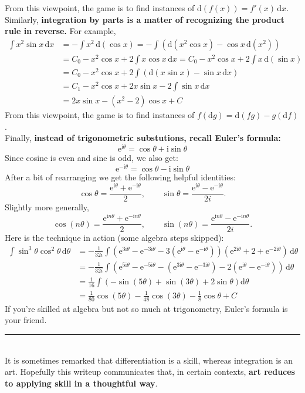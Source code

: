 \documentclass[12pt]{memoir}
\def\br{~\\[1em]}
\def\dd{\mathrm d}
\def\ee{\mathrm e}
\def\ii{\mathrm i}
\begin{document}
From this viewpoint, the game is to find instances of 
$\dd(f(x)) = f'(x)\,\dd x$.
\vfill\pagebreak
\noindent
Similarly, 
\textbf{integration by parts is a matter of recognizing the product
rule in reverse.} For example,
\begin{align*}
\int x^2\sin x\,\dd x
&= -\int x^2\,\dd(\cos x)
= -\int\left(\dd\left(x^2\cos x\right) - \cos x\,\dd(x^2)\right)\\
&= C_0 - x^2\cos x + 2\int x\cos x\,\dd x
= C_0 - x^2\cos x + 2\int x\,\dd(\sin x)\\
&= C_0 - x^2\cos x + 2\int\left(\dd(x\sin x) - \sin x\,\dd x\right)\\
&= C_1 - x^2\cos x + 2x\sin x - 2\int\sin x\,\dd x\\
&= \boxed{2x\sin x - (x^2 - 2)\cos x + C}
\end{align*}
From this viewpoint, the game is to find instances of
$f(\dd g) = \dd(fg) - g(\dd f)$.
\br
Finally,
\textbf{instead of trigonometric substutions, recall Euler's formula:}
\[\ee^{\ii\theta} = \cos\theta + \ii\sin\theta\]
Since cosine is even and sine is odd, we also get:
\[\ee^{-\ii\theta} = \cos\theta - \ii\sin\theta\]
After a bit of rearranging we get the following helpful identities:
\[\cos\theta
= \frac{\ee^{\ii\theta} + \ee^{-\ii\theta}}{2},\qquad
\sin\theta
= \frac{\ee^{\ii\theta} - \ee^{-\ii\theta}}{2i}.
\]
Slightly more generally,
\[\cos(n\theta)
= \frac{\ee^{\ii n\theta} + \ee^{-\ii n\theta}}{2},\qquad
\sin(n\theta)
= \frac{\ee^{\ii n\theta} - \ee^{-\ii n\theta}}{2i}.
\]
Here is the technique in action (some algebra steps skipped):
\begin{align*}
\int\sin^3\theta\cos^2\theta\,\dd\theta
&= -\frac{1}{32i}\int
\left(\ee^{3\ii\theta} - \ee^{-3\ii\theta}
- 3\left(\ee^{\ii\theta} - \ee^{-\ii\theta}\right)\right)
\left(\ee^{2\ii\theta} + 2 +
\ee^{-2\ii\theta}\right)\,\dd\theta\\[0.5em]
&= -\frac{1}{32i}\int\left(
\ee^{5\ii\theta} - \ee^{-5\ii\theta}
- \left(
\ee^{3\ii\theta} - \ee^{-3\ii\theta}
\right)
- 2\left(
\ee^{\ii\theta} - \ee^{-\ii\theta}
\right)
\right)\,\dd\theta\\[0.5em]
&= \frac{1}{16}\int\left(-\sin(5\theta)
+ \sin(3\theta) + 2\sin\theta\right)\dd\theta\\[0.5em]
&= \boxed{\frac{1}{80}\cos(5\theta)
- \frac{1}{48}\cos(3\theta) - \frac{1}{8}\cos\theta + C}
\end{align*}
If you're skilled at algebra but not so much at trigonometry,
Euler's formula is your friend.
\br
\hrule
\br
It is sometimes remarked that differentiation is a skill,
whereas integration is an art. Hopefully this writeup communicates
that, in certain contexts,
\textbf{art reduces to applying skill in a thoughtful way}.
\end{document}
